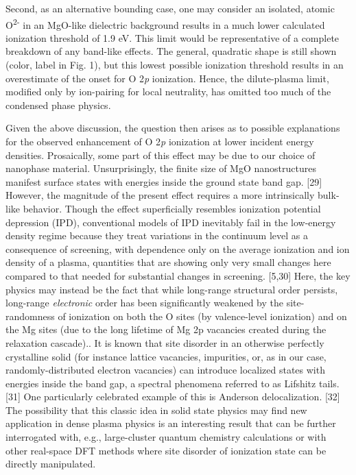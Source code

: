 Second, as an alternative bounding case, one may consider an isolated,
atomic O\textsuperscript{2-} in an MgO-like dielectric background
results in a much lower calculated ionization threshold of 1.9 eV. This
limit would be representative of a complete breakdown of any band-like
effects. The general, quadratic shape is still shown (color, label in
Fig. 1), but this lowest possible ionization threshold results in an
overestimate of the onset for O 2\emph{p} ionization. Hence, the
dilute-plasma limit, modified only by ion-pairing for local neutrality,
has omitted too much of the condensed phase physics.

Given the above discussion, the question then arises as to possible
explanations for the observed enhancement of O 2\emph{p} ionization at
lower incident energy densities. Prosaically, some part of this effect
may be due to our choice of nanophase material. Unsurprisingly, the
finite size of MgO nanostructures manifest surface states with energies
inside the ground state band gap. {[}29{]} However, the magnitude of the
present effect requires a more intrinsically bulk-like behavior. Though
the effect superficially resembles ionization potential depression
(IPD), conventional models of IPD inevitably fail in the low-energy
density regime because they treat variations in the continuum level as a
consequence of screening, with dependence only on the average ionization
and ion density of a plasma, quantities that are showing only very small
changes here compared to that needed for substantial changes in
screening. {[}5,30{]} Here, the key physics may instead be the fact that
while long-range structural order persists, long-range \emph{electronic}
order has been significantly weakened by the site-randomness of
ionization on both the O sites (by valence-level ionization) and on the
Mg sites (due to the long lifetime of Mg 2p vacancies created during the
relaxation cascade).. It is known that site disorder in an otherwise
perfectly crystalline solid (for instance lattice vacancies, impurities,
or, as in our case, randomly-distributed electron vacancies) can
introduce localized states with energies inside the band gap, a spectral
phenomena referred to as Lifshitz tails. {[}31{]} One particularly
celebrated example of this is Anderson delocalization. {[}32{]} The
possibility that this classic idea in solid state physics may find new
application in dense plasma physics is an interesting result that can be
further interrogated with, e.g., large-cluster quantum chemistry
calculations or with other real-space DFT methods where site disorder of
ionization state can be directly manipulated.

